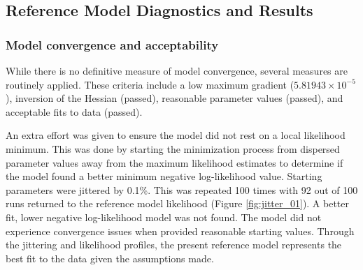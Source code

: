 \documentclass[11pt,
  english,
  a4paper,
]{article}
\begin{document}
\leavevmode\tagmcend\tagstructend\par


\hypertarget{reference-model-diagnostics-and-results}{%
\subsection{Reference Model Diagnostics and Results}\label{reference-model-diagnostics-and-results}}

\leavevmode\tagmcend\tagstructend


\hypertarget{model-convergence-and-acceptability}{%
\subsubsection{Model convergence and acceptability}\label{model-convergence-and-acceptability}}

\leavevmode\tagmcend\tagstructend


While there is no definitive measure of model convergence, several measures are routinely applied. These criteria include a low maximum gradient (\ensuremath{5.81943\times 10^{-5}}), inversion of the Hessian (passed), reasonable parameter values (passed), and acceptable fits to data (passed).

\leavevmode\tagmcend\tagstructend\par


An extra effort was given to ensure the model did not rest on a local likelihood minimum. This was done by starting the minimization process from dispersed parameter values away from the maximum likelihood estimates to determine if the model found a better minimum negative log-likelihood value. Starting parameters were jittered by 0.1\%. This was repeated 100 times with 92 out of 100 runs returned to the reference model likelihood (Figure \ref{fig:jitter_01}). A better fit, lower negative log-likelihood model was not found. The model did not experience convergence issues when provided reasonable starting values. Through the jittering and likelihood profiles, the present reference model represents the best fit to the data given the assumptions made.

\leavevmode\tagmcend\tagstructend\par
\end{document}
